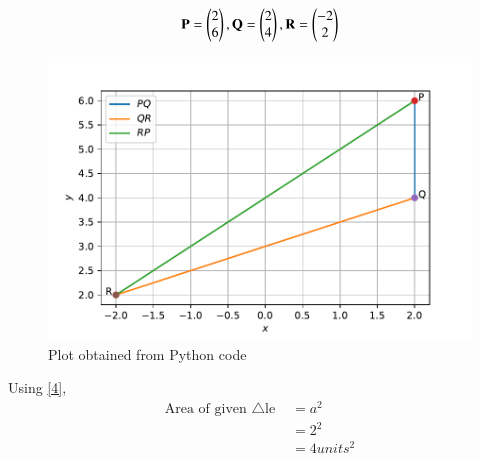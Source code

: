 \documentclass[journal,12pt,twocolumn]{IEEEtran}
\renewcommand\thesection{\arabic{section}}
\begin{document}
\begin{enumerate}[label=\thesection.\arabic*.,ref=\thesection.\theenumi]
\begin{align}
\mathbf{P}=\begin{pmatrix}2\\6\end{pmatrix},\mathbf{Q}=\begin{pmatrix}2\\4\end{pmatrix},\mathbf{R}=\begin{pmatrix}-2\\2\end{pmatrix}
\end{align}

\begin{figure}[h]
	\centering
	\includegraphics[width=\columnwidth]{Figure_1.pdf}
	\caption{Plot obtained from Python code}
	\label{Fig:3.1}
\end{figure}

Using \eqref{4},
\begin{align}
\text{Area of given $\triangle$le }&=a^2\\
&=2^2\\
&=4 units^2
\end{align}

\end{enumerate}
\end{document}
